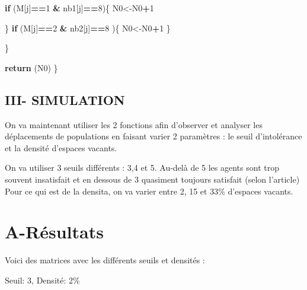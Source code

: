 \documentclass[
]{article}
\newenvironment{Shaded}{\begin{snugshade}}{\end{snugshade}}
\newcommand{\CommentTok}[1]{\textcolor[rgb]{0.56,0.35,0.01}{\textit{#1}}}
\newcommand{\ControlFlowTok}[1]{\textcolor[rgb]{0.13,0.29,0.53}{\textbf{#1}}}
\newcommand{\DataTypeTok}[1]{\textcolor[rgb]{0.13,0.29,0.53}{#1}}
\newcommand{\DecValTok}[1]{\textcolor[rgb]{0.00,0.00,0.81}{#1}}
\newcommand{\FloatTok}[1]{\textcolor[rgb]{0.00,0.00,0.81}{#1}}
\newcommand{\KeywordTok}[1]{\textcolor[rgb]{0.13,0.29,0.53}{\textbf{#1}}}
\newcommand{\NormalTok}[1]{#1}
\newcommand{\OperatorTok}[1]{\textcolor[rgb]{0.81,0.36,0.00}{\textbf{#1}}}
\newcommand{\StringTok}[1]{\textcolor[rgb]{0.31,0.60,0.02}{#1}}
\begin{document}
\begin{Shaded}
\begin{Highlighting}[]
  \ControlFlowTok{if}\NormalTok{ (M[j]}\OperatorTok{==}\DecValTok{1} \OperatorTok{&}\StringTok{ }\NormalTok{nb1[j]}\OperatorTok{==}\DecValTok{8}\NormalTok{)\{}
\NormalTok{    N0<-N0}\OperatorTok{+}\DecValTok{1}
    
\NormalTok{  \}}
  \ControlFlowTok{if}\NormalTok{ (M[j]}\OperatorTok{==}\DecValTok{2} \OperatorTok{&}\StringTok{ }\NormalTok{nb2[j]}\OperatorTok{==}\DecValTok{8}\NormalTok{ )\{}
\NormalTok{    N0<-N0}\OperatorTok{+}\DecValTok{1}
\NormalTok{  \}}

\NormalTok{\}}


\KeywordTok{return}\NormalTok{ (N0)}
\NormalTok{\}}
\end{Highlighting}
\end{Shaded}

\hypertarget{iii--simulation}{%
\subsection{III- SIMULATION}\label{iii--simulation}}

On va maintenant utiliser les 2 fonctions afin d'observer et analyser
les déplacements de populations en faisant varier 2 paramètres : le
seuil d'intolérance et la densité d'espaces vacants.

On va utiliser 3 seuils différents : 3,4 et 5. Au-delà de 5 les agents
sont trop souvent insatisfait et en dessous de 3 quasiment toujours
satisfait (selon l'article) Pour ce qui est de la densita, on va varier
entre 2, 15 et 33\% d'espaces vacants.

\hypertarget{a-ruxe9sultats}{%
\section{A-Résultats}\label{a-ruxe9sultats}}

Voici des matrices avec les différents seuils et densités :

Seuil: 3, Densité: 2\%

\begin{Shaded}
\end{Shaded}
\end{document}
